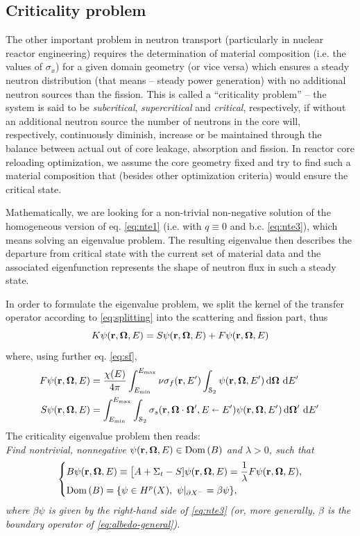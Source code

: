 \subsection{Criticality problem}

The other important problem in neutron transport (particularly in nuclear reactor engineering) requires the
determination of material composition (i.e. the values of $\sigma_x$) for a given domain geometry (or vice versa)
which ensures a steady neutron distribution (that means -- steady power generation) with no additional neutron sources
than the fission. This is called a ``criticality problem'' -- the system is said to be \textit{subcritical},
\textit{supercritical} and \textit{critical}, respectively, if without an additional neutron source the number of
neutrons in the core will, respectively, continuously diminish, increase or be maintained through the
balance between actual out of core leakage, absorption and fission. In reactor core reloading optimization, we assume
the core geometry fixed and try to find such a material composition that (besides other optimization criteria) would
ensure the critical state. 

Mathematically, we are looking for a non-trivial non-negative solution of the homogeneous
version of eq. \eqref{eq:nte1} (i.e. with $q\equiv 0$ and b.c. \eqref{eq:nte3}), which means solving an eigenvalue
problem. The resulting eigenvalue then describes the departure from critical state with the current set of material
data and the associated eigenfunction represents the shape of neutron flux in such a steady state. 

In order to formulate
the eigenvalue problem, we split the kernel of the transfer operator according to \eqref{eq:splitting} into the 
scattering and fission part, thus
$$
K\psi(\br,\bomega,E)
  			= S\psi(\br,\bomega,E) + F\psi(\br,\bomega,E)
$$
where, using further eq. \eqref{eq:sf},
$$
\begin{aligned}
F\psi(\br,\bomega,E) &= \frac{\chi(E)}{4\pi}\intE[']{\Emin}{\Emax}{\nu\sigma_f(\br,E')\intA{\psi(\br,\bomega,E')}}\\
S\psi(\br,\bomega,E) &= \intE[']{\Emin}{\Emax}{\intA[']{\sigma_s(\br,\bomega\cdot\bomega',E\sla
E')\psi(\br,\bomega,E')}}
\end{aligned}
$$
The criticality eigenvalue problem then reads:\\
\textit{Find nontrivial, nonnegative $\psi(\br,\bomega,E)\in \Dom{B}$ and $\lambda > 0$, such that}
\begin{equation}\label{eq:critical}
\left\{
  \begin{aligned}
     &B\psi(\br,\bomega,E) \equiv \bigl[A + \Sigma_t - S]\psi(\br,\bomega,E) = \frac{1}{\lambda} F\psi(\br,\bomega,E),\\
     &\Dom{B} = \{\psi\in \Hp(X),\ \psi\vert_{\pX[-]} = \beta\psi\},
  \end{aligned}
\right.
\end{equation}
\textit{where $\beta\psi$ is given by the right-hand side of \eqref{eq:nte3} (or, more generally, $\beta$ is the
boundary operator of \eqref{eq:albedo-general})}.  

